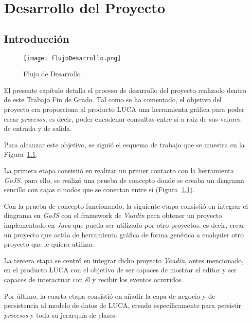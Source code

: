 \chapter{Desarrollo del Proyecto}

\minitoc

\section{Introducción}

\begin{figure}[!tb]
	\centering
	\texttt{[image: flujoDesarrollo.png]}
	\caption{Flujo de Desarrollo}
	\label{fig:flujoDesarrollo}
\end{figure}


El presente capítulo detalla el proceso de desarrollo del proyecto realizado dentro de este Trabajo Fin de Grado. Tal como se ha comentado, el objetivo del proyecto era 
proporciona al producto LUCA una herramienta gráfica para poder crear \emph{procesos}, es decir, poder encadenar consultas entre sí a raíz de sus valores de entrada y de salida.

Para alcanzar este objetivo, se siguió el esquema de trabajo que se muestra en la Figura~\ref{fig:flujoDesarrollo}.  

La primera etapa consistió en realizar un primer contacto con la herramienta \emph{GoJS}, para ello, se realizó una prueba de concepto donde se creaba un diagrama sencillo con cajas o nodos que se conectan entre sí (Figura~\ref{}).

Con la prueba de concepto funcionando, la siguiente etapa consistió en integrar el diagrama en \emph{GoJS} con el framework de \emph{Vaadin} para obtener un proyecto implementado en \emph{Java} que pueda ser utilizado por otro proyectos, es decir, crear un proyecto que actúa de herramienta gráfica de forma genérica a cualquier otro proyecto que le quiera utilizar.

La tercera etapa se centró en integrar dicho proyecto \emph{Vaadin}, antes mencionado, en el producto LUCA con el objetivo de ser capaces de mostrar el editor y ser capaces de interactuar con él y recibir los eventos ocurridos.

Por último, la cuarta etapa consistió en añadir la capa de negocio y de persistencia al modelo de datos de LUCA, creado específicamente para persistir \emph{procesos} y toda su jerarquía de clases.

